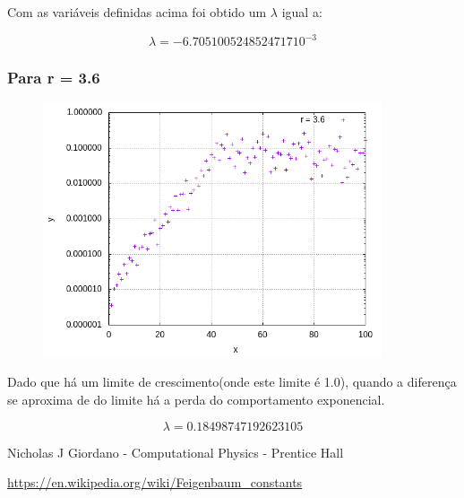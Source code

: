 \documentclass[a4paper, 12pt]{article}
\begin{document}
Com as variáveis definidas acima foi obtido um $\lambda$ igual a: 

\begin{equation*}
	\lambda =  -6.7051005248524717 10^{-3}
\end{equation*}

\hspace{0.5cm}

\subsubsection{Para r = 3.6}

\hspace{0.5cm}




\begin{figure}[H]
	\centering
	\caption{}{}
	\includegraphics[width=10.0cm]{Chaosr=3_6.png}
	\label{fig:chaos_3_6}
\end{figure}

Dado que há um limite de crescimento(onde este limite é 1.0), quando a diferença se aproxima de do limite há a perda do comportamento exponencial.

\begin{equation*}
 	\lambda = 0.18498747192623105
\end{equation*}


\begin{thebibliography}{9}
Nicholas J Giordano - Computational Physics - Prentice Hall

\url{https://en.wikipedia.org/wiki/Feigenbaum_constants} 


\end{thebibliography}
\end{document}
